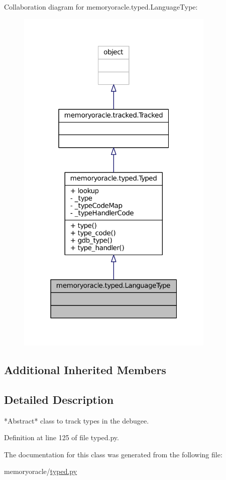 Collaboration diagram for memoryoracle.\+typed.\+Language\+Type\+:\nopagebreak
\begin{figure}[H]
\begin{center}
\leavevmode
\includegraphics[width=268pt]{classmemoryoracle_1_1typed_1_1LanguageType__coll__graph}
\end{center}
\end{figure}
\subsection*{Additional Inherited Members}


\subsection{Detailed Description}
\begin{DoxyVerb}*Abstract* class to track types in the debugee.
\end{DoxyVerb}
 

Definition at line 125 of file typed.\+py.



The documentation for this class was generated from the following file\+:\begin{DoxyCompactItemize}
\item 
memoryoracle/\hyperlink{typed_8py}{typed.\+py}\end{DoxyCompactItemize}
